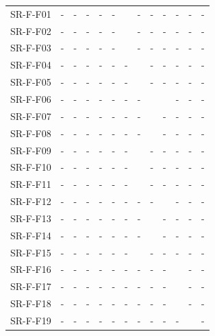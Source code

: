 \begin{table}[htb]
  \centering
  \begin{tabular}{@{}L{3cm}C{0.7cm}C{0.7cm}C{0.7cm}C{0.7cm}C{0.7cm}C{0.7cm}C{0.7cm}C{0.7cm}C{0.7cm}C{0.7cm}C{0.7cm}C{0.7cm}@{}}
    \toprule
      &  &  &  &  &  &  &  &  &  &  &  & \\
    \midrule
    SR-F-F01 & - & - & - & - & - &  & - & - & - & - & - & - \\
    SR-F-F02 & - & - & - & - & - &  & - & - & - & - & - & - \\
    SR-F-F03 & - & - & - & - & - &  & - & - & - & - & - & - \\
    SR-F-F04 & - & - & - & - & - & - &  & - & - & - & - & - \\
    SR-F-F05 & - & - & - & - & - & - &  & - & - & - & - & - \\
    SR-F-F06 & - & - & - & - & - & - & - &  &  & - & - & - \\
    SR-F-F07 & - & - & - & - & - & - & - &  & - & - & - & - \\
    SR-F-F08 & - & - & - & - & - & - & - &  & - & - & - & - \\
    SR-F-F09 & - & - & - & - & - & - &  & - & - & - & - & - \\
    SR-F-F10 & - & - & - & - & - & - &  & - & - & - & - & - \\
    SR-F-F11 & - & - & - & - & - & - &  & - & - & - & - & - \\
    SR-F-F12 & - & - & - & - & - & - & - & - &  & - & - & - \\
    SR-F-F13 & - & - & - & - & - & - & - &  & - & - & - & - \\
    SR-F-F14 & - & - & - & - & - & - & - &  & - & - & - & - \\
    SR-F-F15 & - & - & - & - & - & - &  & - & - & - & - & - \\
     SR-F-F16 & - & - & - & - & - & - & - & - & - &  & - & - \\
    SR-F-F17 & - & - & - & - & - & - & - & - & - &  & - & - \\
    SR-F-F18 & - & - & - & - & - & - & - & - & - &  & - & - \\
    SR-F-F19 & - & - & - & - & - & - & - & - & - & - &  & - \\

\end{tabular}
\end{table}
